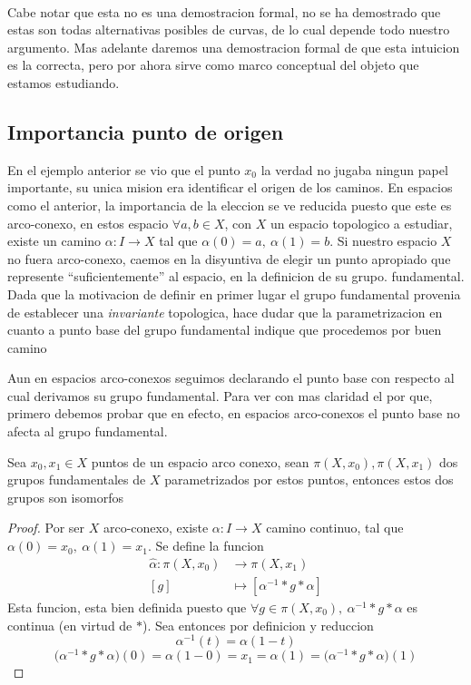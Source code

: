 {\paragraph{} Cabe notar que esta no es una demostracion formal, no se ha demostrado
que estas son todas alternativas posibles de curvas, de lo cual depende
todo nuestro argumento. Mas adelante daremos una demostracion formal de
que esta intuicion es la correcta, pero por ahora sirve como marco
conceptual del objeto que estamos estudiando.

\subsection{Importancia punto de origen}
En el ejemplo anterior se vio que el punto \(x_0\) la verdad no
jugaba ningun papel importante, su unica mision era identificar el
origen de los caminos. En espacios como el anterior, la importancia de
la eleccion se ve reducida puesto que este es arco-conexo, en estos
espacio \(\forall a,b \in X\), con \(X\) un espacio topologico a
estudiar, existe un camino \(\alpha : I \to X\) tal que \(\alpha (0) =
a,\ \alpha (1) = b\). Si nuestro espacio \(X\) no fuera arco-conexo,
caemos en la disyuntiva de elegir un punto apropiado que represente
``suficientemente'' al espacio, en la definicion de su grupo.
fundamental. Dada que la motivacion de definir en primer lugar el grupo
fundamental provenia de establecer una \emph{invariante} topologica,
hace dudar que la parametrizacion en cuanto a punto base del grupo
fundamental indique que procedemos por buen camino

Aun en espacios arco-conexos seguimos declarando el punto base con
respecto al cual derivamos su grupo fundamental. Para ver con mas
claridad el por que, primero debemos probar que en efecto, en espacios
arco-conexos el punto base no afecta al grupo fundamental.
\begin{teorema} \label{not:alpha-hat}
  Sea \(x_0 , x_1 \in X\) puntos de un espacio arco conexo, sean \(\pi
  (X, x_0), \pi (X, x_1)\) dos grupos fundamentales de \(X\)
  parametrizados por estos puntos, entonces estos dos grupos son isomorfos
\end{teorema}
\begin{proof}
  Por ser \(X\) arco-conexo, existe \(\alpha : I \to X\) camino
  continuo, tal que \(\alpha (0) = x_0,\ \alpha (1) = x_1\). Se define
  la funcion
  \begin{align*}
    \hat \alpha : \pi (X, x_0) &\to \pi (X, x_1) \\
    [g] &\mapsto [ \alpha^{-1} * g * \alpha ]
  \end{align*}
  Esta funcion, esta bien definida puesto que \(\forall g \in \pi (X,
  x_0),\ \alpha^{-1} * g * \alpha \) es continua (en virtud de \(*\)).
  Sea entonces por definicion y reduccion
  \[ \alpha^{-1} (t) = \alpha (1 - t)\]
  \[\big(\alpha^{-1} * g * \alpha \big) (0) = \alpha (1 - 0) = x_1 = \alpha (1) =
    \big(\alpha^{-1} * g * \alpha \big) (1)\]


\end{proof}}
